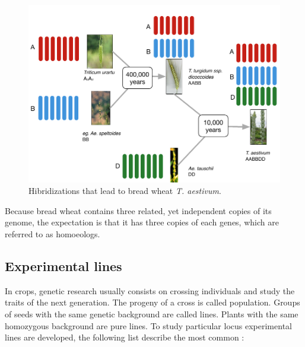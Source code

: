 \begin{figure}
  \includegraphics[width=1\textwidth]{LitReview/Figures/WheatPolyplodization.pdf}
  \caption{Hibridizations that lead to bread wheat \textit{T. aestivum}.  }
  \label{fig:lit:polyplody}
\end{figure}
Because bread wheat contains three related, yet independent copies of its genome, the expectation is that it has three copies of each genes, which are referred to as homoeologs. 




\subsection{Experimental lines}

In crops, genetic research usually consists on crossing individuals and study the traits of the next generation. 
The progeny of a cross is called population. 
Groups of seeds with the same genetic background are called lines. 
Plants with the same homozygous background are pure lines. 
To study particular locus experimental lines are developed, the following list describe the most common \citep{VanOoijen2013Intro}:

